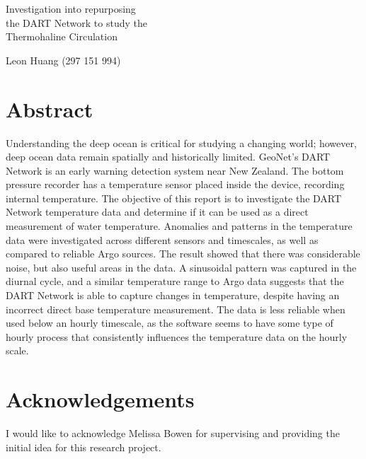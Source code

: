 \documentclass[12pt,a4paper]{article}
\begin{document}
\thispagestyle{empty}
\begin{center}
  {\huge Investigation into repurposing\\
    the DART Network to study the\\
    Thermohaline Circulation\par}
  \vspace{1.5em}
  Leon Huang (297 151 994)
\end{center}
\clearpage


{\tableofcontents}
\clearpage


\section{Abstract}

Understanding the deep ocean is critical for studying a changing world;
however, deep ocean data remain spatially and historically limited. GeoNet's
DART Network is an early warning detection system near New Zealand. The bottom
pressure recorder has a temperature sensor placed inside the device, recording
internal temperature. The objective of this report is to investigate the DART
Network temperature data and determine if it can be used as a direct
measurement of water temperature. Anomalies and patterns in the temperature
data were investigated across different sensors and timescales, as well as
compared to reliable Argo sources. The result showed that there was
considerable noise, but also useful areas in the data. A sinusoidal pattern
was captured in the diurnal cycle, and a similar temperature range to Argo
data suggests that the DART Network is able to capture changes in temperature,
despite having an incorrect direct base temperature measurement. The data is
less reliable when used below an hourly timescale, as the software seems to
have some type of hourly process that consistently influences the temperature
data on the hourly scale.

\section{Acknowledgements}

I would like to acknowledge Melissa Bowen for supervising and providing the
initial idea for this research project.
\end{document}
